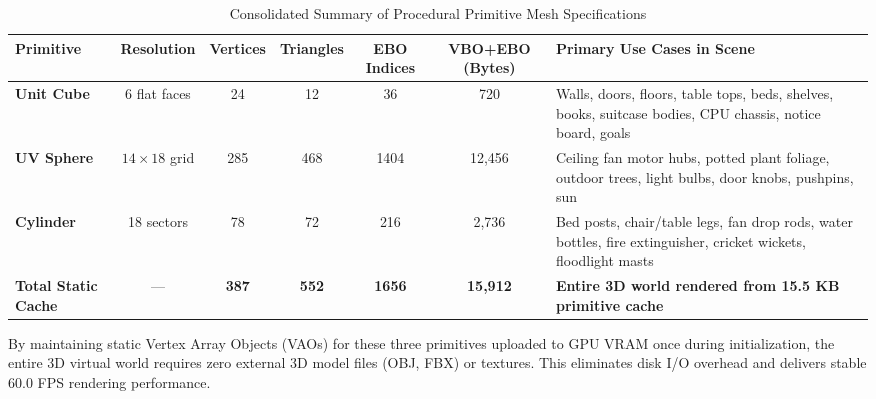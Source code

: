 \documentclass[11pt,a4paper]{article}
\begin{document}
\begin{table}[H]
\centering
\scriptsize
\caption{Consolidated Summary of Procedural Primitive Mesh Specifications}
\label{tab:primitives_summary}
\begin{tabularx}{\textwidth}{lcccccX}
\toprule
\rowcolor{tableheader}
\textcolor{tableheadertext}{\textbf{Primitive}} & 
\textcolor{tableheadertext}{\textbf{Resolution}} & 
\textcolor{tableheadertext}{\textbf{Vertices}} & 
\textcolor{tableheadertext}{\textbf{Triangles}} & 
\textcolor{tableheadertext}{\textbf{EBO Indices}} & 
\textcolor{tableheadertext}{\textbf{VBO+EBO (Bytes)}} & 
\textcolor{tableheadertext}{\textbf{Primary Use Cases in Scene}} \\
\midrule
\rowcolor{lightgraybg}
\textbf{Unit Cube} & 6 flat faces & 24 & 12 & 36 & 720 & Walls, doors, floors, table tops, beds, shelves, books, suitcase bodies, CPU chassis, notice board, goals \\
\textbf{UV Sphere} & $14 \times 18$ grid & 285 & 468 & 1404 & 12,456 & Ceiling fan motor hubs, potted plant foliage, outdoor trees, light bulbs, door knobs, pushpins, sun \\
\rowcolor{lightgraybg}
\textbf{Cylinder}  & 18 sectors & 78 & 72 & 216 & 2,736 & Bed posts, chair/table legs, fan drop rods, water bottles, fire extinguisher, cricket wickets, floodlight masts \\
\midrule
\textbf{Total Static Cache} & --- & \textbf{387} & \textbf{552} & \textbf{1656} & \textbf{15,912} & \textbf{Entire 3D world rendered from 15.5 KB primitive cache} \\
\bottomrule
\end{tabularx}
\end{table}

\begin{tcolorbox}[colback=boxbg, colframe=kuetblue, arc=3pt, title={\textbf{Engineering Principle: Zero External CAD Asset Dependency}}, fonttitle=\bfseries]
By maintaining static Vertex Array Objects (VAOs) for these three primitives uploaded to GPU VRAM once during initialization, the entire 3D virtual world requires zero external 3D model files (OBJ, FBX) or textures. This eliminates disk I/O overhead and delivers stable 60.0 FPS rendering performance.
\end{tcolorbox}
\end{document}
